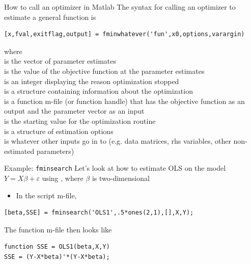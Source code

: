 \documentclass[english,xcolor=dvipsnames]{beamer}
\begin{document}
\begin{frame}[fragile]{How to call an optimizer in Matlab}
The syntax for calling an optimizer to estimate a general function is
\begin{lstlisting}
[x,fval,exitflag,output] = fminwhatever('fun',x0,options,varargin)
\end{lstlisting}
where \\
 is the vector of parameter estimates\\
 is the value of the objective function at the parameter estimates\\
 is an integer displaying the reason optimization stopped\\
 is a structure containing information about the optimization\\
 is a function m-file (or function handle) that has the objective function as an output and the parameter vector as an input\\
 is the starting value for the optimization routine\\
 is a structure of estimation options\\
 is whatever other inputs go in to  (e.g. data matrices, rhs variables, other non-estimated parameters)\\
\end{frame}

\begin{frame}[fragile]{Example: \texttt{fminsearch}}
Let's look at how to estimate OLS on the model $Y=X\beta+\varepsilon$ using , where $\beta$ is two-dimensional
\begin{itemize}
	\item In the script m-file, 
\end{itemize}
\begin{lstlisting}
[beta,SSE] = fminsearch('OLS1',.5*ones(2,1),[],X,Y);
\end{lstlisting}
The function m-file then looks like
\begin{lstlisting}
function SSE = OLS1(beta,X,Y)
SSE = (Y-X*beta)'*(Y-X*beta);
\end{lstlisting}
\end{frame}
\end{document}

